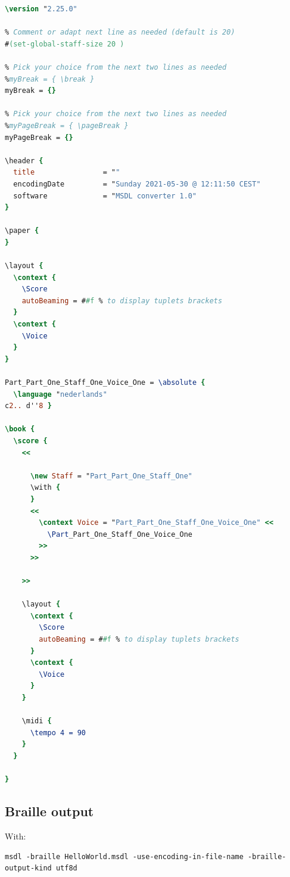 \begin{lstlisting}[language=Lilypond]
\version "2.25.0"

% Comment or adapt next line as needed (default is 20)
#(set-global-staff-size 20 )

% Pick your choice from the next two lines as needed
%myBreak = { \break }
myBreak = {}

% Pick your choice from the next two lines as needed
%myPageBreak = { \pageBreak }
myPageBreak = {}

\header {
  title                = ""
  encodingDate         = "Sunday 2021-05-30 @ 12:11:50 CEST"
  software             = "MSDL converter 1.0"
}

\paper {
}

\layout {
  \context {
    \Score
    autoBeaming = ##f % to display tuplets brackets
  }
  \context {
    \Voice
  }
}

Part_Part_One_Staff_One_Voice_One = \absolute {
  \language "nederlands"
c2.. d''8 }

\book {
  \score {
    <<

      \new Staff = "Part_Part_One_Staff_One"
      \with {
      }
      <<
        \context Voice = "Part_Part_One_Staff_One_Voice_One" <<
          \Part_Part_One_Staff_One_Voice_One
        >>
      >>

    >>

    \layout {
      \context {
        \Score
        autoBeaming = ##f % to display tuplets brackets
      }
      \context {
        \Voice
      }
    }

    \midi {
      \tempo 4 = 90
    }
  }

}
\end{lstlisting}

\subsection{Braille output}

With:
\begin{lstlisting}[language=Terminal]
msdl -braille HelloWorld.msdl -use-encoding-in-file-name -braille-output-kind utf8d
\end{lstlisting}

